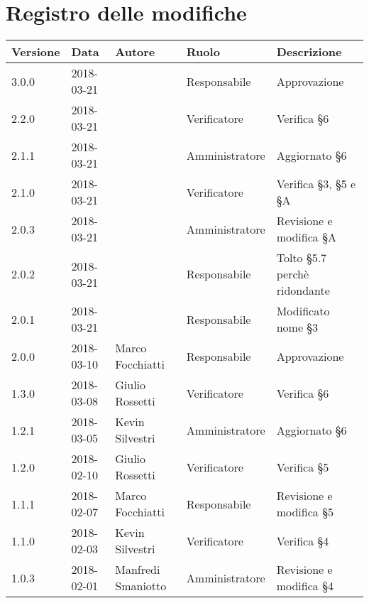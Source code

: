 \documentclass[./PianodiProgetto.tex]{subfiles}
\begin{document}
\chapter*{Registro delle modifiche}
\setlength\LTleft{-22mm}
\begin{longtable}{|p{20mm}|p{20mm}|p{40mm}|p{30mm}|p{50mm}|}
	\hline
	\textbf{Versione} & \textbf{Data} & \textbf{Autore} & \textbf{Ruolo} & \textbf{Descrizione} \\ 
	
		\hline 3.0.0 & 2018-03-21 &  & Responsabile & Approvazione \\
	
		\hline 2.2.0 & 2018-03-21 &  & Verificatore & Verifica §6 \\
	
		\hline 2.1.1 & 2018-03-21 &  & Amministratore & Aggiornato §6 \\ 
		
		\hline 2.1.0 & 2018-03-21 &  & Verificatore & Verifica §3, §5 e §A  \\
	
		\hline 2.0.3 & 2018-03-21 &  & Amministratore & Revisione e modifica §A \\
		
		\hline 2.0.2 & 2018-03-21 &  & Responsabile & Tolto §5.7 perchè ridondante \\
	
		\hline 2.0.1 & 2018-03-21 &  & Responsabile & Modificato nome §3 \\
	
		\hline 2.0.0 & 2018-03-10 & Marco Focchiatti & Responsabile & Approvazione \\
		
		\hline 1.3.0 & 2018-03-08 & Giulio Rossetti & Verificatore & Verifica §6 \\
		
		\hline 1.2.1 & 2018-03-05 & Kevin Silvestri & Amministratore & Aggiornato §6 \\
		
		\hline 1.2.0 & 2018-02-10 & Giulio Rossetti & Verificatore & Verifica §5 \\
		
		\hline 1.1.1 & 2018-02-07 & Marco Focchiatti & Responsabile & Revisione e modifica §5 \\
		
		\hline 1.1.0 & 2018-02-03 & Kevin Silvestri & Verificatore & Verifica §4 \\
				
		\hline 1.0.3 & 2018-02-01 & Manfredi Smaniotto & Amministratore & Revisione e modifica §4 \\
		

\end{longtable}
\end{document}
